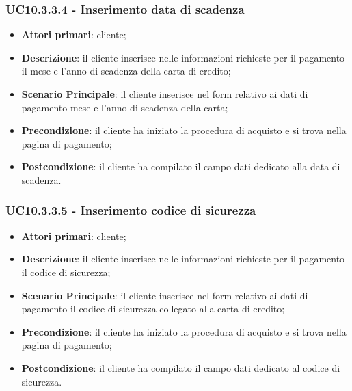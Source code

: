 \subsubsection{UC10.3.3.4 - Inserimento data di scadenza}
\begin{itemize}
\item \textbf{Attori primari}: cliente;
\item \textbf{Descrizione}: il cliente inserisce nelle informazioni richieste per il pagamento il mese e l'anno di scadenza della carta di credito;
\item \textbf{Scenario Principale}: il cliente inserisce nel form relativo ai dati di pagamento mese e l'anno di scadenza della carta;
\item \textbf{Precondizione}: il cliente ha iniziato la procedura di acquisto e si trova nella pagina di pagamento;
\item \textbf{Postcondizione}: il cliente ha compilato il campo dati dedicato alla data di scadenza.
\end{itemize}

\subsubsection{UC10.3.3.5 - Inserimento codice di sicurezza}
\begin{itemize}
\item \textbf{Attori primari}: cliente;
\item \textbf{Descrizione}: il cliente inserisce nelle informazioni richieste per il pagamento il codice di sicurezza;
\item \textbf{Scenario Principale}: il cliente inserisce nel form relativo ai dati di pagamento il codice di sicurezza collegato alla carta di credito;
\item \textbf{Precondizione}: il cliente ha iniziato la procedura di acquisto e si trova nella pagina di pagamento;
\item \textbf{Postcondizione}: il cliente ha compilato il campo dati dedicato al codice di sicurezza.
\end{itemize}

